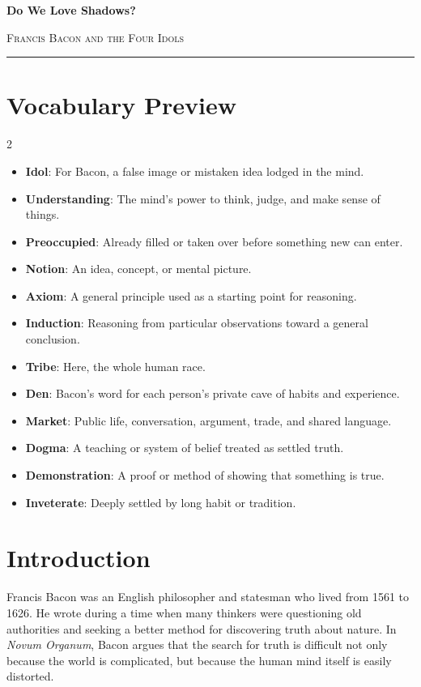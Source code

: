 \documentclass[12pt]{article}
\begin{document}
\begin{center}
{\LARGE\bfseries Do We Love Shadows?}\par\vspace{0.25em}
{\large\scshape Francis Bacon and the Four Idols}\par\vspace{0.45em}
\rule{0.82\textwidth}{0.4pt}\par\vspace{0.7em}
\end{center}

\section*{Vocabulary Preview}
\begin{multicols}{2}
\begin{itemize}[leftmargin=*, itemsep=0.18em]
\item \textbf{Idol}: For Bacon, a false image or mistaken idea lodged in the mind.
\item \textbf{Understanding}: The mind's power to think, judge, and make sense of things.
\item \textbf{Preoccupied}: Already filled or taken over before something new can enter.
\item \textbf{Notion}: An idea, concept, or mental picture.
\item \textbf{Axiom}: A general principle used as a starting point for reasoning.
\item \textbf{Induction}: Reasoning from particular observations toward a general conclusion.
\item \textbf{Tribe}: Here, the whole human race.
\item \textbf{Den}: Bacon's word for each person's private cave of habits and experience.
\item \textbf{Market}: Public life, conversation, argument, trade, and shared language.
\item \textbf{Dogma}: A teaching or system of belief treated as settled truth.
\item \textbf{Demonstration}: A proof or method of showing that something is true.
\item \textbf{Inveterate}: Deeply settled by long habit or tradition.
\end{itemize}
\end{multicols}

\section*{Introduction}
Francis Bacon was an English philosopher and statesman who lived from 1561 to 1626. He wrote during a time when many thinkers were questioning old authorities and seeking a better method for discovering truth about nature. In \textit{Novum Organum}, Bacon argues that the search for truth is difficult not only because the world is complicated, but because the human mind itself is easily distorted.
\end{document}
